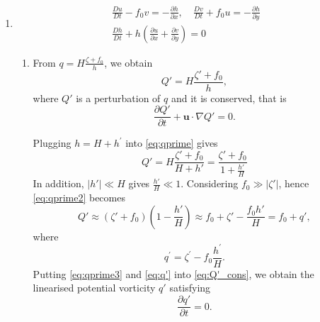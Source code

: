 \documentclass[a4paper]{article}
\begin{document}
\begin{enumerate}[label=\textbf{\arabic*.}]
	\item 
		$$\left.\begin{array} { c } { \frac { D u } { D t } - f _ { 0} v = - \frac { \partial h } { \partial x } ,\quad \frac { D v } { D t } + f _ { 0} u = - \frac { \partial h } { \partial y } } \\ { \frac { D h } { D t } + h \left( \frac { \partial u } { \partial x } + \frac { \partial v } { \partial y } \right) = 0} \end{array} \right.$$
	
	
		\begin{enumerate}[label=\textbf{(\alph*)}]
		\item From $q = H \frac {\zeta + f_{ 0}} {h}$, we obtain
		\begin{equation}\label{eq:qprime}
			Q' = H \frac {\zeta' + f_{ 0}} {h},
		\end{equation}
		where $Q'$ is a perturbation of $q$ and it is conserved, that is 
		\begin{equation}
			\frac{\partial Q'}{\partial t}+\bm u\cdot \nabla Q'=0.
			\label{eq:Q'_cons}
		\end{equation}

		Plugging $h = H + h^{ \prime }$ into \eqref{eq:qprime} gives
		\begin{equation}
			 Q'= H \frac{\zeta' + f_{ 0}} {H+h'} = \frac{\zeta' + f_{0}} {1+\frac{h'}{H}}
			 \label{eq:qprime2}
		\end{equation}
		In addition, $|h'|\ll H$ gives $\frac{h'}{H}\ll 1$. Considering $f_0\gg |\zeta'|$, hence \eqref{eq:qprime2} becomes
		\begin{equation}
		Q'\approx (\zeta' + f_{0}) \left( 1-\frac{h'}{H}\right) \approx f_0+\zeta'-\frac{f_0h'}{H}=f_0+q',
		\label{eq:qprime3}
		\end{equation}
		where	
		\begin{equation}
			q^{\prime } = \zeta^{\prime} - f_{0}\frac{h^{\prime }}{ H }.
			\label{eq:q'}
		\end{equation}
		Putting \eqref{eq:qprime3} and \eqref{eq:q'} into \eqref{eq:Q'_cons}, we obtain the linearised potential vorticity $q'$ satisfying 
		\begin{equation}
			\frac{\partial q'}{\partial t}=0.
		\end{equation}
		
		

\end{enumerate}
\end{enumerate}
\end{document}
